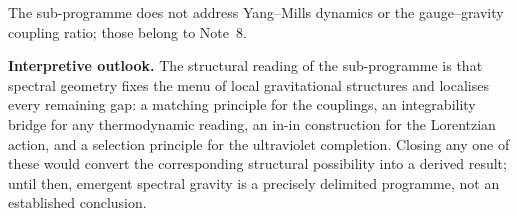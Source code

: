 \documentclass[11pt,a4paper]{article}
\theoremstyle{definition}
\begin{document}
    The sub-programme does not address Yang--Mills dynamics or the gauge--gravity coupling
    ratio; those belong to Note~8.

    \medskip
    \textbf{Interpretive outlook.}
    The structural reading of the sub-programme is that spectral geometry fixes the menu of
    local gravitational structures and localises every remaining gap: a matching principle
    for the couplings, an integrability bridge for any thermodynamic reading, an in-in
    construction for the Lorentzian action, and a selection principle for the ultraviolet
    completion.
    Closing any one of these would convert the corresponding structural possibility into a
    derived result; until then, emergent spectral gravity is a precisely delimited
    programme, not an established conclusion.

    \newpage
    
    
\end{document}
